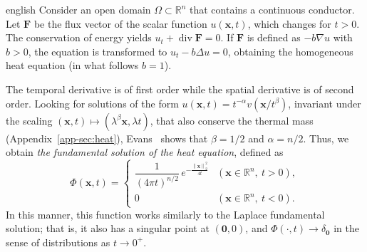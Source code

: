 \documentclass[11pt,letterpaper,twoside,openright]{book} %
\newcommand{\norm}[1]{\left\lVert #1 \right\rVert}
\begin{document}
\begin{hyphenrules}{english}
Consider an open domain $\Omega\subset\mathbb{R}^n$ that contains a continuous conductor. Let $\mathbf{F}$ be the flux
vector of the scalar function $u(\mathbf{x},t)$, which changes for $t>0$. The conservation of energy yields
$u_t+\operatorname{div}\mathbf{F}=0$. If $\mathbf{F}$ is defined as $-b\nabla u$ with $b>0$, the equation is transformed
to $u_t-b\Delta u=0$, obtaining the homogeneous heat equation (in what follows $b=1$).

The temporal derivative is of first order while the spatial derivative is of second order. Looking for
solutions of the form $u(\mathbf{x},t)=t^{-\alpha}v(\mathbf{x}/t^{\beta})$, invariant under the scaling
$(\mathbf{x},t)\mapsto(\lambda^{\beta}\mathbf{x},\lambda t)$, that also conserve the thermal mass
(Appendix~\ref{app-sec:heat}), Evans~\cite{evans2010} shows that $\beta=1/2$ and $\alpha=n/2$. Thus, we obtain
\emph{the fundamental solution of the heat equation}, defined as
\begin{equation}
  \Phi(\mathbf{x},t)=
  \begin{cases}
    \dfrac{1}{(4\pi t)^{n/2}}\,e^{-\frac{\norm{\mathbf{x}}_2^2}{4t}} & (\mathbf{x}\in\mathbb{R}^n,\ t>0),\\[2mm]
    0 & (\mathbf{x}\in\mathbb{R}^n,\ t<0).
  \end{cases}
  \label{eq:heat-fundamental}
\end{equation}
In this manner, this function works similarly to the Laplace fundamental solution; that is, it also has
a singular point at $(\mathbf{0},0)$, and $\Phi(\cdot,t)\to\delta_{\mathbf{0}}$ in the sense of
distributions as $t\to0^+$.


\end{hyphenrules}
\end{document}
